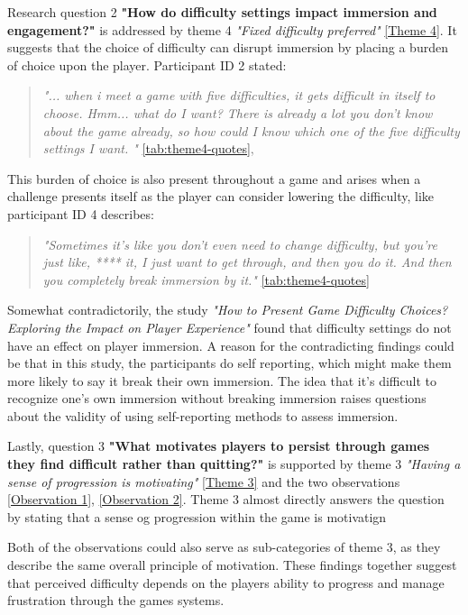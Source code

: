 Research question 2 \textbf{"How do difficulty settings impact immersion and engagement?"} is addressed by theme 4 \textit{"Fixed difficulty preferred"} \ref{Theme 4}. It suggests that the choice of difficulty can disrupt immersion by placing a burden of choice upon the player. Participant ID 2 stated:
\begin{quote}
    \textit{"... when i meet a game with five difficulties, it gets difficult in itself to choose. Hmm... what do I want? There is already a lot you don't know about the game already, so how could I know which one of the five difficulty settings I want. "} \ref{tab:theme4-quotes},
\end{quote}
This burden of choice is also present throughout a game and arises when a challenge presents itself as the player can consider lowering the difficulty, like participant ID 4 describes:
\begin{quote}
    \textit{"Sometimes it's like you don't even need to change difficulty, but you're just like, **** it, I just want to get through, and then you do it. And then you completely break immersion by it."} \ref{tab:theme4-quotes}
\end{quote}
Somewhat contradictorily, the study \textit{"How to Present Game Difficulty Choices? Exploring the Impact on Player Experience"} \cite{jan_d_smeddinck_how_2016} found that difficulty settings do not have an effect on player immersion. A reason for the contradicting findings could be that in this study, the participants do self reporting, which might make them more likely to say it break their own immersion. The idea that it's difficult to recognize one's own immersion without breaking immersion raises questions about the validity of using self-reporting methods to assess immersion.

Lastly, question 3 \textbf{"What motivates players to persist through games they find difficult rather than quitting?"} is supported by theme 3 \textit{"Having a sense of progression is motivating"} \ref{Theme 3} and the two observations \ref{Observation 1}, \ref{Observation 2}. Theme 3 almost directly answers the question by stating that a sense og progression within the game is motivatign

Both of the observations could also serve as sub-categories of theme 3, as they describe the same overall principle of motivation. These findings together suggest that perceived difficulty depends on the players ability to progress and manage frustration through the games systems. 


